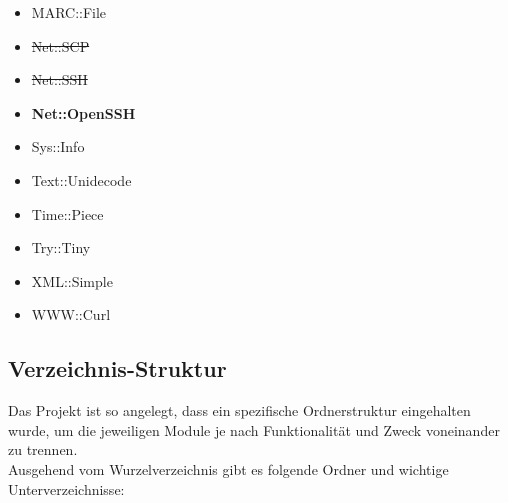 \documentclass[10pt]{article}
\begin{document}
\begin{itemize}
\begin{itemize}
		\item MARC::File 		%
		\item \sout{Net::SCP}	%
		\item \sout{Net::SSH}	%
		\item \textbf{Net::OpenSSH}
		\item Sys::Info 		%
		\item Text::Unidecode 	%
		\item Time::Piece 		%
		\item Try::Tiny 		%
		\item XML::Simple		%
		\item WWW::Curl			%
	\end{itemize}
\end{itemize}

\subsection{Verzeichnis-Struktur}
\label{sec:verzeichnis}
Das Projekt ist so angelegt, dass ein spezifische Ordnerstruktur eingehalten wurde, um die jeweiligen Module je nach Funktionalität und Zweck voneinander zu trennen. \\
Ausgehend vom Wurzelverzeichnis gibt es folgende Ordner und wichtige Unterverzeichnisse:
\end{document}
